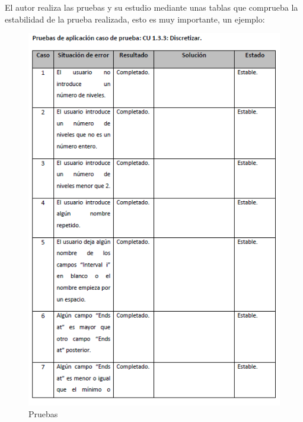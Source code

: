 El autor realiza las pruebas y su estudio mediante unas tablas que comprueba la estabilidad de la prueba realizada, esto es muy importante, un ejemplo:

\begin{figure}[H]
  \includegraphics[scale=0.7]{capitulos/img/img5.PNG}
  \caption{Pruebas}
  \label{fig:img5}
\end{figure}
\clearpage
\hspace{15px}


